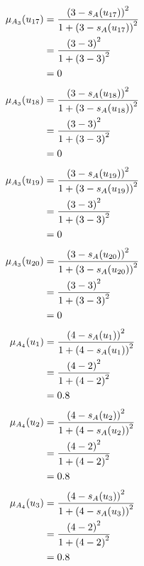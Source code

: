 \documentclass[a4paper,openany]{book}
\begin{document}
				\begin{align}
					\mu_{A_3}(u_{17}) &= \frac{\left(3-s_A(u_{17})\right)^2}{1 + \left(3-s_A(u_{17})\right)^2}\\
					&= \frac{\left(3-3\right)^2}{1 + \left(3-3\right)^2} \notag \\
					&= 0 \notag
				\end{align}
				\begin{align}
					\mu_{A_3}(u_{18}) &= \frac{\left(3-s_A(u_{18})\right)^2}{1 + \left(3-s_A(u_{18})\right)^2}\\
					&= \frac{\left(3-3\right)^2}{1 + \left(3-3\right)^2} \notag \\
					&= 0 \notag
				\end{align}
				\begin{align}
					\mu_{A_3}(u_{19}) &= \frac{\left(3-s_A(u_{19})\right)^2}{1 + \left(3-s_A(u_{19})\right)^2}\\
					&= \frac{\left(3-3\right)^2}{1 + \left(3-3\right)^2} \notag \\
					&= 0 \notag
				\end{align}
				\begin{align}
					\mu_{A_3}(u_{20}) &= \frac{\left(3-s_A(u_{20})\right)^2}{1 + \left(3-s_A(u_{20})\right)^2}\\
					&= \frac{\left(3-3\right)^2}{1 + \left(3-3\right)^2} \notag \\
					&= 0 \notag
				\end{align}
				\begin{align}
					\mu_{A_4}(u_1) &= \frac{\left(4-s_A(u_1)\right)^2}{1 + \left(4-s_A(u_1)\right)^2}\\
					&= \frac{\left(4-2\right)^2}{1 + \left(4-2\right)^2} \notag \\
					&= 0.8 \notag
				\end{align}
				\begin{align}
					\mu_{A_4}(u_2) &= \frac{\left(4-s_A(u_2)\right)^2}{1 + \left(4-s_A(u_2)\right)^2}\\
					&= \frac{\left(4-2\right)^2}{1 + \left(4-2\right)^2} \notag \\
					&= 0.8 \notag
				\end{align}
				\begin{align}
					\mu_{A_4}(u_3) &= \frac{\left(4-s_A(u_3)\right)^2}{1 + \left(4-s_A(u_3)\right)^2}\\
					&= \frac{\left(4-2\right)^2}{1 + \left(4-2\right)^2} \notag \\
					&= 0.8 \notag
				\end{align}
\end{document}
